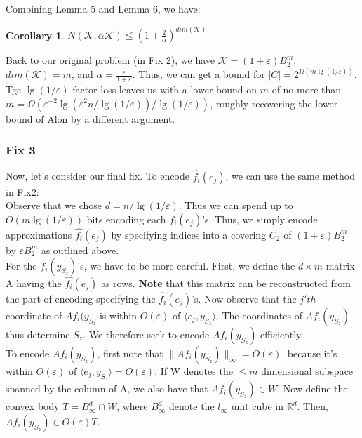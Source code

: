 \documentclass[11pt]{article}
\newcommand{\eps}{\varepsilon}
\newcommand{\R}{\mathbb{R}}
\newtheorem{corollary}[theorem]{Corollary}
\begin{document}
Combining Lemma 5 and Lemma 6, we have:
\begin{corollary}
$N(\mathcal{K}, \alpha \mathcal{K}) \leq (1+\frac{2}{\alpha})^{dim(\mathcal{K})}$ 
\end{corollary}

Back to our original problem (in Fix 2), we have $\mathcal{K} = (1+\eps)B_2^m$, $dim(\mathcal{K}) = m$, and $\alpha = \frac{\eps}{1+\eps}$. Thus, we can get a bound for $|C| = 2^{\Omega(m \lg(1/\eps))}$. Tge $\lg(1/\eps)$ factor loss leaves us with a lower bound on $m$ of no more than $m = \Omega(\eps^{-2}\lg(\eps^2n/\lg(1/\eps))/\lg(1/\eps))$, roughly recovering the lower bound of Alon \cite{alon1996space} by a different argument. 


\subsubsection{Fix 3}
Now, let's consider our final fix. To encode $\hat{f_i}(e_j)$, we can use the same method in Fix2:\\
Observe that we chose $d = n/\lg(1/\eps)$. Thus we can spend up to $O(m\lg(1/\eps))$ bits encoding each $f_i(e_j)$'s. Thus, we simply encode approximations $\hat{f_i}(e_j)$ by specifying indices into a covering $C_2$ of $(1+\eps)B_2^m$ by $\eps B_2^m$ as outlined above.\\

For the $f_i(y_{S_z})$'s, we have to be more careful. First, we define the $d \times m$ matrix A having the $\hat{f_i}(e_j)$ as rows. \textbf{Note} that this matrix can be reconstructed from the part of encoding specifying the $\hat{f_i}(e_j)$'s. Now observe that the $j'th$ coordinate of $Af_i(y_{S_z}$ is within $O(\eps)$ of $\langle e_j, y_{S_z} \rangle$. The coordinates of $Af_i(y_{S_z})$ thus determine $S_z$. We therefore seek to encode $Af_i(y_{S_z})$ efficiently. \\

To encode $Af_i(y_{S_z})$, first note that $\|Af_i(y_{S_z})\|_{\infty} = O(\eps)$, because it's within $O(\eps)$ of $\langle e_j, y_{S_z} \rangle = O(\eps)$. If W denotes the $\leq m$ dimensional subspace spanned by the column of A, we also have that $Af_i(y_{S_z}) \in W$. Now define the convex body $T = B_{\infty}^d \cap W$, where $B_{\infty}^d$ denote the $l_{\infty}$ unit cube in $\R^d$. Then, $Af_i(y_{S_z}) \in O(\eps) T$. 
\end{document}
